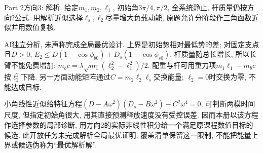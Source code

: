 \begin{exercise}
Part 2方向3: 解析. 给定$m_1,m_2,\ell_1$, 初始角$3\pi/4,\pi/2$, 全系统静止, 杆质量仍按方向2公式. 用解析近似选择$\ell_s,\ell_2$尽量增大负载动能, 原题允许分阶段作三角函数近似并用数值复核.
\end{exercise}
\begin{solution}
AI独立分析, 未声称完成全局最优设计. 上界是初始势相对最低势的差; 对固定支点且$D>0$, $E_2\le D(1-\cos\phi_{b0})+D_s(1-\cos\phi_{s0})$. 杆质量随总长增长, 所以长臂不能免费增加: $m_bc=\lambda\sqrt{m_1}(\ell_2^2-\ell_1^2)/2$. 配重与杆可用重力项$m_1\ell_1-m_bc$按$\ell_2^2$下降. 另一方面动能矩阵通过$C=m_2\ell_2\ell_s$交换能量; $\ell_2=0$时交换为零, 不能达成目标.

小角线性近似给特征方程$(D-A\omega^2)(D_s-B\omega^2)-C^2\omega^4=0$, 可判断两模时间尺度, 但指定初始角很大, 用其直接预测释放速度没有受控误差. 因而本册以该方程作选择参数的局部诊断, 用方向2的实际非线性积分给一个满足原课程数值目标的候选. 此开放任务未完成解析全局最优证明, 覆盖清单保留这一限制, 不能把能量上界或候选伪称为“最优解析解”.
\end{solution}

